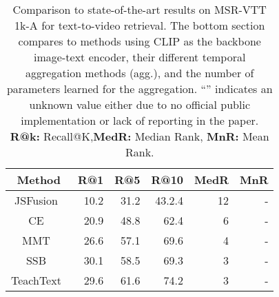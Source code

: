 \begin{table}[t]
\setlength{\tabcolsep}{5pt}
\scriptsize
\caption{\small{Comparison to state-of-the-art results on MSR-VTT 1k-A for text-to-video retrieval. The bottom section compares to methods using CLIP as the backbone image-text encoder, their different temporal aggregation methods (agg.), and the number of parameters learned for the aggregation. ``'' indicates an unknown value either due to no official public implementation or lack of reporting in the paper. \textbf{R@k:} Recall@K,\textbf{MedR:} Median Rank, \textbf{MnR:} Mean Rank.}}
\centering
\begin{tabular}{@{}rccrrrrr@{}}
\toprule
\multicolumn{3}{c}{\textbf{Method}}        & \multicolumn{1}{c}{\textbf{R@1}} & \multicolumn{1}{c}{\textbf{R@5}} & \multicolumn{1}{c}{\textbf{R@10}} & \multicolumn{1}{c}{\textbf{MedR}} & \multicolumn{1}{c}{\textbf{MnR}} \\ \midrule
\multicolumn{3}{c}{JSFusion~\cite{yu2018joint}}                                                                    & 10.2                             & 31.2                             & 43.2.4                              & 12                                &   -                               \\
\multicolumn{3}{c}{CE~\cite{Liu19a}}                                             & 20.9                             & 48.8                             & 62.4                              & 6                                 &   -                               \\
\multicolumn{3}{c}{MMT~\cite{gabeur2020multi}}                                                                    & 26.6                             & 57.1                             & 69.6                              & 4                                 &    -                              \\
\multicolumn{3}{c}{SSB~\cite{patrick2020support}}                                                                     & 30.1                             & 58.5                             & 69.3                              & 3                                 &  -                                \\
\multicolumn{3}{c}{TeachText~\cite{Croitoru21a}}                                                                     & 29.6                             & 61.6                             & 74.2                              & 3                                 &   -                               \\

\end{tabular}
\end{table}
